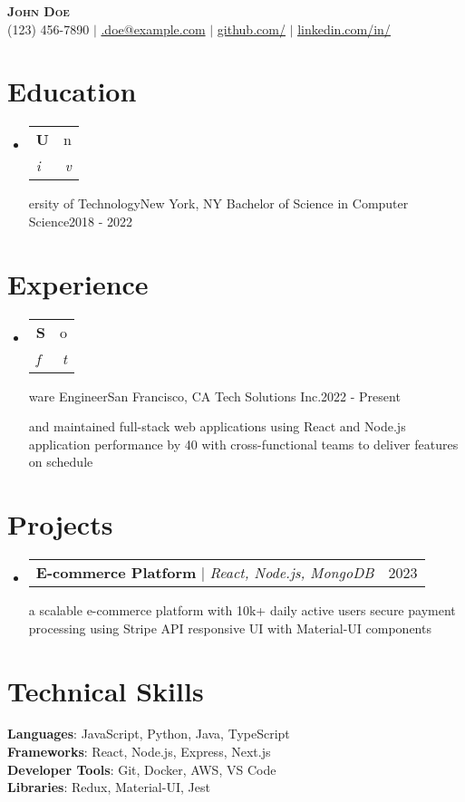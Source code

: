 \documentclass[letterpaper,11pt]{article}
\makeatletter
\newcommand{\resumeSubheading}[4]{
  \vspace{-2pt}\item
    \begin{tabular*}{0.97\textwidth}[t]{l@{\extracolsep{\fill}}r}
      \textbf{#1} & #2 \\
      \textit{\small#3} & \textit{\small #4} \\
    \end{tabular*}\vspace{-7pt}
}
\newcommand{\resumeProjectHeading}[2]{
    \item
    \begin{tabular*}{0.97\textwidth}{l@{\extracolsep{\fill}}r}
      \small#1 & #2 \\
    \end{tabular*}\vspace{-7pt}
}
\newcommand{\resumeSubHeadingListStart}{\begin{itemize}[leftmargin=0.15in, label={}]}
\newcommand{\resumeSubHeadingListEnd}{\end{itemize}}
\newcommand{\resumeItemListStart}{\begin{itemize}}
\newcommand{\resumeItemListEnd}{\end{itemize}\vspace{-5pt}}
\makeatother
\begin{document}
\begin{center}
    \textbf{\Huge \scshape John Doe} \\ \vspace{1pt}
    \small 
    (123) 456-7890
     $|$ 
    \href{mailto:john.doe@example.com}{\underlinejohn.doe@example.com}
     $|$ 
    \href{https://github.com/}{\underline{github.com/}}
     $|$ 
    \href{https://linkedin.com/in/}{\underline{linkedin.com/in/}}
\end{center}

\section{Education}
\resumeSubHeadingListStart
\resumeSubheading
    University of TechnologyNew York, NY
    Bachelor of Science in Computer Science2018 - 2022
\resumeSubHeadingListEnd

\section{Experience}
\resumeSubHeadingListStart
\resumeSubheading
    Software EngineerSan Francisco, CA
    Tech Solutions Inc.2022 - Present
    \resumeItemListStart
    \resumeItemDeveloped and maintained full-stack web applications using React and Node.js
    \resumeItemImproved application performance by 40%
    \resumeItemCollaborated with cross-functional teams to deliver features on schedule
    \resumeItemListEnd
\resumeSubHeadingListEnd

\section{Projects}
\resumeSubHeadingListStart
\resumeProjectHeading
    {\textbf{ E-commerce Platform } $|$ \emph{ React, Node.js, MongoDB }}{ 2023 }
    \resumeItemListStart
    \resumeItemBuilt a scalable e-commerce platform with 10k+ daily active users
    \resumeItemImplemented secure payment processing using Stripe API
    \resumeItemDesigned responsive UI with Material-UI components
    \resumeItemListEnd
\resumeSubHeadingListEnd

\section{Technical Skills}
\begin{itemize}[leftmargin=0.15in, label={}]
    \small{\item{
        \textbf{Languages}{: JavaScript, Python, Java, TypeScript } \\
        \textbf{Frameworks}{: React, Node.js, Express, Next.js } \\
        \textbf{Developer Tools}{: Git, Docker, AWS, VS Code } \\
        \textbf{Libraries}{: Redux, Material-UI, Jest }
    }}
\end{itemize}
\end{document}
